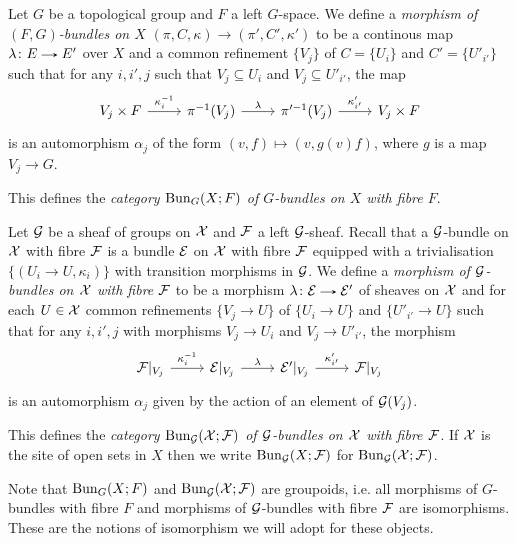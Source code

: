 \begin{definitions}
  \label{fibre-bundle-cat}
  Let $G$ be a topological group and $F$ a left $G$-space. We define a
  \emph{morphism of $(F,G)$-bundles on $X$} $(\pi,C,\kappa) \to
  (\pi',C',\kappa')$ to be a continous map $\lambda \c E \to E'$ over
  $X$ and a common refinement $\{V_j\}$ of $C = \{U_i\}$ and $C' =
  \{U'_{i'}\}$ such that for any $i,i',j$ such that $V_j \subseteq
  U_i$ and $V_j \subseteq U'_{i'}$, the map
  \[
  \begin{tikzcd}
    V_j \times F \ar{r}{\kappa_i^{-1}} &
    \pi^{-1}(V_j) \ar{r}{\lambda} &
    \pi'^{-1}(V_j) \ar{r}{\kappa'_{i'}} &
    V_j \times F
  \end{tikzcd}
  \]
  is an automorphism $\alpha_j$ of the form $(v,f) \mapsto (v,
  g(v)f)$, where $g$ is a map $V_j \to G$.

  This defines the \emph{category $\operatorname{Bun}_G(X;F)$ of $G$-bundles on $X$
    with fibre $F$}.
\end{definitions}
  
\begin{definitions}
  \label{bundle-sheaf-cat}
  Let $\mathcal{G}$ be a sheaf of groups on $\mathcal{X}$ and $\mathcal{F}$ a left
  $\mathcal{G}$-sheaf. Recall  that a $\mathcal{G}$-bundle on $\mathcal{X}$
  with fibre $\mathcal{F}$ is a bundle $\mathcal{E}$ on $\mathcal{X}$ with fibre $\mathcal{F}$ equipped
  with a trivialisation $\{(U_i \to U,\kappa_i)\}$ with transition
  morphisms in $\mathcal{G}$. We define a \emph{morphism of $\mathcal{G}$-bundles on
    $\mathcal{X}$ with fibre $\mathcal{F}$} to be a morphism $\lambda \c \E \to \E'$ of
  sheaves on $\mathcal{X}$ and for each $U \in \mathcal{X}$ common refinements $\{V_j
  \to U\}$ of $\{U_i \to U\}$ and $\{U'_{i'} \to U\}$ such that for
  any $i,i',j$ with morphisms $V_j \to U_i$ and $V_j \to U'_{i'}$, the
  morphism
  \[
  \begin{tikzcd}
    \F|_{V_j} \ar{r}{\kappa_i^{-1}} &
    \E|_{V_j} \ar{r}{\lambda} &
    \E'|_{V_j} \ar{r}{\kappa'_{i'}} &
    \F|_{V_j}
  \end{tikzcd}
  \]
  is an automorphism $\alpha_j$ given by the action of an element of
  $\mathcal{G}(V_j)$.

  This defines the \emph{category $\operatorname{Bun}_{\mathcal{G}}(\mathcal{X};\mathcal{F})$ of $\mathcal{G}$-bundles on
    $\mathcal{X}$ with fibre $\mathcal{F}$}. If $\mathcal{X}$ is the site of open sets in $X$
  then we write $\operatorname{Bun}_{\mathcal{G}}(X;\mathcal{F})$ for $\operatorname{Bun}_{\mathcal{G}}(\mathcal{X};\mathcal{F})$.
\end{definitions}

\begin{remark}
  Note that $\operatorname{Bun}_G(X;F)$ and $\operatorname{Bun}_{\mathcal{G}}(\mathcal{X};\mathcal{F})$ are groupoids, i.e. all
  morphisms of $G$-bundles with fibre $F$ and morphisms of
  $\mathcal{G}$-bundles with fibre $\mathcal{F}$ are isomorphisms. These are the notions
  of isomorphism we will adopt for these objects.
\end{remark}

